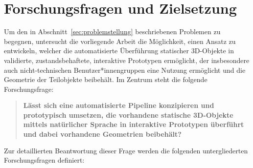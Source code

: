 


\section{Forschungsfragen und Zielsetzung}\label{sec:forschungsfragen_zielsetzung}

Um den in Abschnitt~\ref{sec:problemstellung} beschriebenen Problemen zu begegnen, untersucht die vorliegende Arbeit die Möglichkeit, einen Ansatz zu entwickeln, welcher die automatisierte Überführung statischer 3D-Objekte in validierte, zustandsbehaftete, interaktive Prototypen ermöglicht, der insbesondere auch nicht-technischen Benutzer*innengruppen eine Nutzung ermöglicht und die Geometrie der Teilobjekte beibehält.
Im Zentrum steht die folgende Forschungsfrage:



\begin{quote}
	\textbf{Lässt sich eine automatisierte Pipeline konzipieren und prototypisch umsetzen, die vorhandene statische 3D-Objekte mittels natürlicher Sprache in interaktive Prototypen überführt und dabei vorhandene Geometrien beibehält?}
\end{quote}

Zur detaillierten Beantwortung dieser Frage werden die folgenden untergliederten Forschungsfragen definiert:

